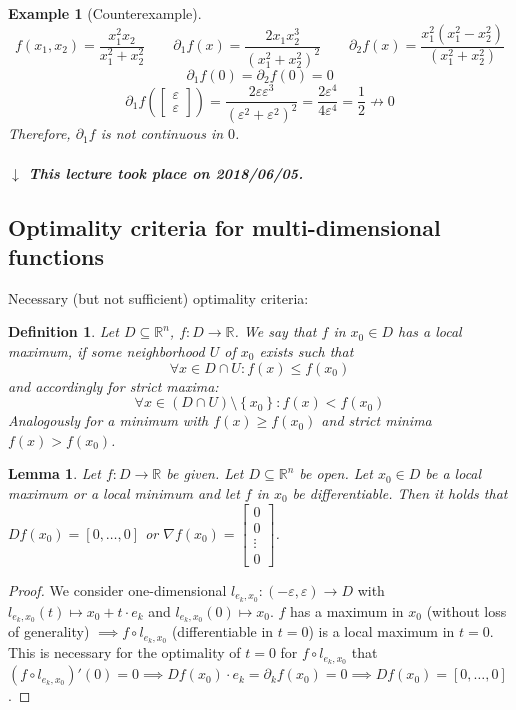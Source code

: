 \documentclass{article}
\newtheorem{example}{Example}  \numberwithin{example}{section}
\newtheorem{definition}{Definition}  \numberwithin{definition}{section}
\newtheorem{lemma}{Lemma}  \numberwithin{lemma}{section}
\newcommand{\set}[1]{\left\{#1\right\}}
\newcommand{\dateref}[1]{%
  \begin{mdframed}[backgroundcolor=gray!10,innerbottommargin=0pt,innertopmargin=0pt]
    \paragraph{\textit{$\downarrow$ This lecture took place on #1.}}%
  \end{mdframed}%
}
\begin{document}
\begin{example}[Counterexample]
  \[
    f(x_1, x_2) = \frac{x_1^2 x_2}{x_1^2 + x_2^2}
    \qquad \partial_1 f(x) = \frac{2x_1 x_2^3}{(x_1^2 + x_2^2)^2}
    \qquad \partial_2 f(x) = \frac{x_1^2 (x_1^2 - x_2^2)}{(x_1^2 + x_2^2)}
  \] \[
    \partial_1 f(0) = \partial_2 f(0) = 0
  \] \[
    \partial_1f(\begin{bmatrix} \varepsilon \\ \varepsilon \end{bmatrix}) = \frac{2 \varepsilon \varepsilon^3}{(\varepsilon^2 + \varepsilon^2)^2} = \frac{2\varepsilon^4}{4 \varepsilon^4} = \frac12 \not\to 0
  \]
  Therefore, $\partial_1 f$ is not continuous in $0$.
\end{example}

\dateref{2018/06/05}

\subsection{Optimality criteria for multi-dimensional functions}

Necessary (but not sufficient) optimality criteria:
\begin{definition} %
  Let $D \subseteq \mathbb R^n$, $f: D \to \mathbb R$.
  We say that $f$ in $x_0 \in D$ has a local maximum, if some neighborhood $U$ of $x_0$ exists such that
  \[ \forall x \in D \cap U: f(x) \leq f(x_0) \]
  and accordingly for strict maxima:
  \[ \forall x \in (D \cap U) \setminus \set{x_0}: f(x) < f(x_0) \]
  Analogously for a minimum with $f(x) \geq f(x_0)$ and strict minima $f(x) > f(x_0)$.
\end{definition}

\begin{lemma} %
  \label{l8}
  Let $f: D \to \mathbb R$ be given. Let $D \subseteq \mathbb R^n$ be open.
  Let $x_0 \in D$ be a local maximum or a local minimum and let $f$ in $x_0$ be differentiable.
  Then it holds that $Df(x_0) = [0, \dots, 0]$ or $\nabla f(x_0) = \begin{bmatrix} 0 \\ 0 \\ \vdots \\ 0 \end{bmatrix}$.
\end{lemma}

\begin{proof}
  We consider one-dimensional $l_{e_k,x_0}: (-\varepsilon, \varepsilon) \to D$ with $l_{e_k, x_0}(t) \mapsto x_0 + t \cdot e_k$
  and $l_{e_k, x_0}(0) \mapsto x_0$. $f$ has a maximum in $x_0$ (without loss of generality) $\implies f \circ l_{e_k,x_0}$ (differentiable in $t = 0$) is a local maximum in $t = 0$. This is necessary for the optimality of $t = 0$ for $f \circ l_{e_k,x_0}$ that $(f \circ l_{e_k,x_0})'(0) = 0 \implies Df(x_0) \cdot e_k = \partial_k f(x_0) = 0 \implies Df(x_0) = [0, \dots, 0]$.
\end{proof}
\end{document}

